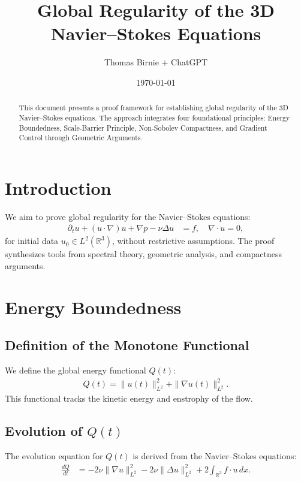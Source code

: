 \documentclass[12pt]{article}
\begin{document}
\title{Global Regularity of the 3D Navier--Stokes Equations}
\author{Thomas Birnie + ChatGPT}
\date{\today}
\maketitle

\begin{abstract}
This document presents a proof framework for establishing global regularity of the 3D Navier--Stokes equations. The approach integrates four foundational principles: Energy Boundedness, Scale-Barrier Principle, Non-Sobolev Compactness, and Gradient Control through Geometric Arguments.
\end{abstract}

\tableofcontents

\section{Introduction}
We aim to prove global regularity for the Navier--Stokes equations:
\begin{align}
\partial_t u + (u \cdot \nabla)u + \nabla p - \nu \Delta u &= f, \quad \nabla \cdot u = 0, \label{NS}
\end{align}
for initial data $u_0 \in L^2(\mathbb{R}^3)$, without restrictive assumptions. The proof synthesizes tools from spectral theory, geometric analysis, and compactness arguments.

\section{Energy Boundedness}
\subsection{Definition of the Monotone Functional}
We define the global energy functional $Q(t)$:
\begin{align}
Q(t) = \|u(t)\|_{L^2}^2 + \|\nabla u(t)\|_{L^2}^2. \label{Q_def}
\end{align}
This functional tracks the kinetic energy and enstrophy of the flow.

\subsection{Evolution of $Q(t)$}
The evolution equation for $Q(t)$ is derived from the Navier--Stokes equations:
\begin{align}
\frac{dQ}{dt} &= -2\nu \|\nabla u\|_{L^2}^2 - 2\nu \|\Delta u\|_{L^2}^2 + 2 \int_{\mathbb{R}^3} f \cdot u \, dx. \label{Q_evolution}
\end{align}
\end{document}
